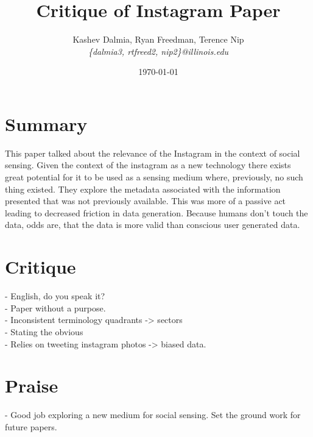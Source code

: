 \documentclass[a4paper]{article}
\title{Critique of Instagram Paper}
\author{Kashev Dalmia, Ryan Freedman, Terence Nip \\
        \textit{\{dalmia3, rtfreed2, nip2\}@illinois.edu}
       }
\date{\today}
\begin{document}
\maketitle

\section{Summary}
This paper talked about the relevance of the Instagram in the context of social sensing. Given the context of the instagram as a new technology there exists great potential for it to be used as a sensing medium where, previously, no such thing existed. They explore the metadata associated with the information presented that was not previously available. This was more of a passive act leading to decreased friction in data generation. Because humans don't touch the data, odds are, that the data is more valid than conscious user generated data. 

\section{Critique}

- English, do you speak it? \\
- Paper without a purpose. \\
- Inconsistent terminology quadrants -> sectors \\
- Stating the obvious \\
- Relies on tweeting instagram photos -> biased data. \\

\section{Praise}
- Good job exploring a new medium for social sensing. Set the ground work for future papers.
\end{document}
